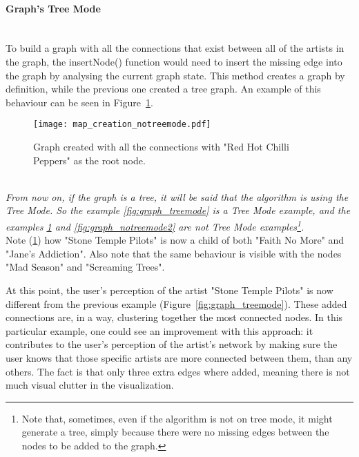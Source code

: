       \paragraph{Graph's Tree Mode} \hfill \\
      To build a graph with all the connections that exist between all of the artists in the graph, the insertNode() function would need to insert the missing edge into the graph by analysing the current graph state.
      This method creates a graph by definition, while the previous one created a tree graph.
      An example of this behaviour can be seen in Figure~\ref{fig:graph_notreemode}.

      \begin{figure}[ht]
        \begin{center}
          \texttt{[image: map\_creation\_notreemode.pdf]}
        \end{center}
        \caption{Graph created with all the connections with "Red Hot Chilli Peppers" as the root node.}
        \label{fig:graph_notreemode}
      \end{figure}

      \hfill \\
      \indent \emph{
      From now on, if the graph is a tree, it will be said that the algorithm is using the \emph{Tree Mode}.
      So the example \ref{fig:graph_treemode} is a \emph{Tree Mode} example, and the examples \ref{fig:graph_notreemode} and \ref{fig:graph_notreemode2} are not \emph{Tree Mode} examples\footnote{
        Note that, sometimes, even if the algorithm is not on tree mode, it might generate a tree, simply because there were no missing edges between the nodes to be added to the graph.
      }.}
      \hfill \\

      Note (\ref{fig:graph_notreemode}) how "Stone Temple Pilots" is now a child of both "Faith No More" and "Jane's Addiction".
      Also note that the same behaviour is visible with the nodes "Mad Season" and "Screaming Trees".

      At this point, the user's perception of the artist "Stone Temple Pilots" is now different from the previous example (Figure~\ref{fig:graph_treemode}).
      These added connections are, in a way, clustering together the most connected nodes.
      In this particular example, one could see an improvement with this approach: it contributes to the user's perception of the artist's network by making sure the user knows that those specific artists are more connected between them, than any others.
      The fact is that only three extra edges where added, meaning there is not much visual clutter in the visualization. \\

